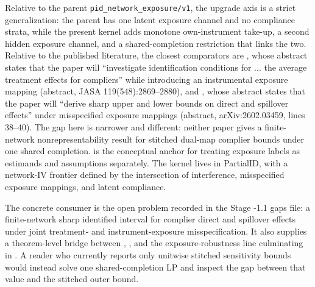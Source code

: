 \documentclass[11pt]{article}
\theoremstyle{definition}
\theoremstyle{plain}
\theoremstyle{remark}
\begin{document}
Relative to the parent \texttt{pid\_network\_exposure/v1}, the upgrade axis is a strict generalization: the parent has one latent exposure channel and no compliance strata, while the present kernel adds monotone own-instrument take-up, a second hidden exposure channel, and a shared-completion restriction that links the two. Relative to the published literature, the closest comparators are \citet{hoshino_yanagi_2024_noncompliance_unknown_interference}, whose abstract states that the paper will ``investigate identification conditions for ... the average treatment effects for compliers'' while introducing an instrumental exposure mapping (abstract, JASA 119(548):2869--2880), and \citet{schroder_oprescu_feuerriegel_kallus_2026_networks_partialid}, whose abstract states that the paper will ``derive sharp upper and lower bounds on direct and spillover effects'' under misspecified exposure mappings (abstract, arXiv:2602.03459, lines 38--40). The gap here is narrower and different: neither paper gives a finite-network nonrepresentability result for stitched dual-map complier bounds under one shared completion. \citet[pp.~1--3]{savje_2024_misspecified_exposure_mappings} is the conceptual anchor for treating exposure labels as estimands and assumptions separately. The kernel lives in PartialID, with a network-IV frontier defined by the intersection of interference, misspecified exposure mappings, and latent compliance.

The concrete consumer is the open problem recorded in the Stage -1.1 gaps file: a finite-network sharp identified interval for complier direct and spillover effects under joint treatment- and instrument-exposure misspecification. It also supplies a theorem-level bridge between \citet{imai_jiang_malani_2021_interference_noncompliance}, \citet{hoshino_yanagi_2024_noncompliance_unknown_interference}, and the exposure-robustness line culminating in \citet{schroder_oprescu_feuerriegel_kallus_2026_networks_partialid}. A reader who currently reports only unitwise stitched sensitivity bounds would instead solve one shared-completion LP and inspect the gap between that value and the stitched outer bound.
\end{document}
